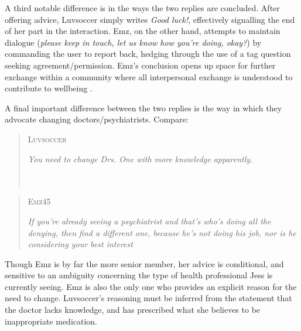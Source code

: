 \documentclass{article}
\begin{document}
A third notable difference is in the ways the two replies are concluded. After offering advice, Luvsoccer simply writes \emph{Good luck!}, effectively signalling the end of her part in the interaction. Emz, on the other hand, attempts to maintain dialogue (\emph{please keep in touch, let us know how you're doing, okay?}) by commanding the user to report back, hedging through the use of a tag question seeking agreement\slash permission. Emz's conclusion opens up space for further exchange within a community where all interpersonal exchange is understood to contribute to wellbeing \parencite[c.f.][]{althoff_counseling_2016}.%


A final important difference between the two replies is the way in which they advocate changing doctors\slash psychiatrists. Compare:

\begin{multicols}{2}
\begin{quote}
\textsc{Luvsoccer}

\emph{You need to change Drs. One with more knowledge apparently.} ~\\~\\~\\
\end{quote}

\begin{quote}
\textsc{Emz45}

\emph{If you're already seeing a psychiatrist and that's who's doing all the denying, then find a different one, because he's not doing his job, nor is he considering your best interest}
\end{quote}
\end{multicols}
%
\noindent Though Emz is by far the more senior member, her advice is conditional, and sensitive to an ambiguity concerning the type of health professional Jess is currently seeing. Emz is also the only one who provides an explicit reason for the need to change. Luvsoccer's reasoning must be inferred from the statement that the doctor lacks knowledge, and has prescribed what she believes to be inappropriate medication. 
\end{document}
